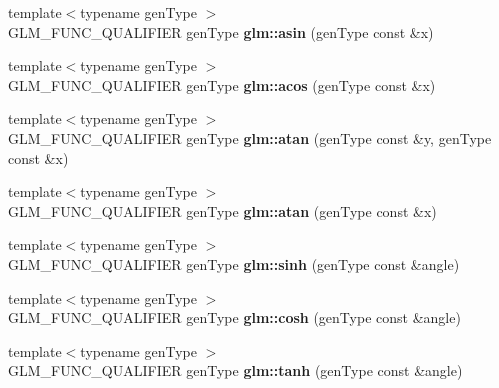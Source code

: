 \begin{DoxyCompactItemize}
\item 
\hypertarget{namespaceglm_a56ea360678fbedce04e22d56e83aab5f}{{\footnotesize template$<$typename gen\-Type $>$ }\\\-G\-L\-M\-\_\-\-F\-U\-N\-C\-\_\-\-Q\-U\-A\-L\-I\-F\-I\-E\-R gen\-Type {\bfseries glm\-::asin} (gen\-Type const \&x)}\label{namespaceglm_a56ea360678fbedce04e22d56e83aab5f}

\item 
\hypertarget{namespaceglm_ac645ab9283c942578235eae06f7e5a33}{{\footnotesize template$<$typename gen\-Type $>$ }\\\-G\-L\-M\-\_\-\-F\-U\-N\-C\-\_\-\-Q\-U\-A\-L\-I\-F\-I\-E\-R gen\-Type {\bfseries glm\-::acos} (gen\-Type const \&x)}\label{namespaceglm_ac645ab9283c942578235eae06f7e5a33}

\item 
\hypertarget{namespaceglm_a6207cc9d98e3e5961d789e70ad3f32c8}{{\footnotesize template$<$typename gen\-Type $>$ }\\\-G\-L\-M\-\_\-\-F\-U\-N\-C\-\_\-\-Q\-U\-A\-L\-I\-F\-I\-E\-R gen\-Type {\bfseries glm\-::atan} (gen\-Type const \&y, gen\-Type const \&x)}\label{namespaceglm_a6207cc9d98e3e5961d789e70ad3f32c8}

\item 
\hypertarget{namespaceglm_a5a2da81c24469e03226999b8e22d531b}{{\footnotesize template$<$typename gen\-Type $>$ }\\\-G\-L\-M\-\_\-\-F\-U\-N\-C\-\_\-\-Q\-U\-A\-L\-I\-F\-I\-E\-R gen\-Type {\bfseries glm\-::atan} (gen\-Type const \&x)}\label{namespaceglm_a5a2da81c24469e03226999b8e22d531b}

\item 
\hypertarget{namespaceglm_ad561b868e32c5edaca7db41068693075}{{\footnotesize template$<$typename gen\-Type $>$ }\\\-G\-L\-M\-\_\-\-F\-U\-N\-C\-\_\-\-Q\-U\-A\-L\-I\-F\-I\-E\-R gen\-Type {\bfseries glm\-::sinh} (gen\-Type const \&angle)}\label{namespaceglm_ad561b868e32c5edaca7db41068693075}

\item 
\hypertarget{namespaceglm_a65ab73738cbd1cb3881e7e0b927c8c92}{{\footnotesize template$<$typename gen\-Type $>$ }\\\-G\-L\-M\-\_\-\-F\-U\-N\-C\-\_\-\-Q\-U\-A\-L\-I\-F\-I\-E\-R gen\-Type {\bfseries glm\-::cosh} (gen\-Type const \&angle)}\label{namespaceglm_a65ab73738cbd1cb3881e7e0b927c8c92}

\item 
\hypertarget{namespaceglm_afcf46a7a4dd1f537d428bc047a710c88}{{\footnotesize template$<$typename gen\-Type $>$ }\\\-G\-L\-M\-\_\-\-F\-U\-N\-C\-\_\-\-Q\-U\-A\-L\-I\-F\-I\-E\-R gen\-Type {\bfseries glm\-::tanh} (gen\-Type const \&angle)}\label{namespaceglm_afcf46a7a4dd1f537d428bc047a710c88}


\end{DoxyCompactItemize}
